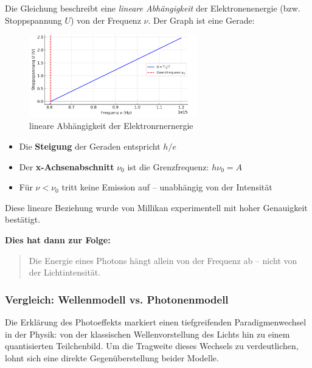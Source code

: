 Die Gleichung beschreibt eine \textit{lineare Abhängigkeit} der Elektronenenergie (bzw. Stoppspannung \( U \)) von der Frequenz \( \nu \). Der Graph ist eine Gerade:
\begin{figure}[H]
	\includegraphics[width=0.65\textwidth]{bilder/photoeffekt.png}
	\caption{lineare Abhängigkeit der Elektronrnernergie}
\end{figure}

\begin{itemize}
	\item Die \textbf{Steigung} der Geraden entspricht \( h/e \)
	\item Der \textbf{x-Achsenabschnitt} \( \nu_0 \) ist die Grenzfrequenz: \( h \nu_0 = A \)
	\item Für \( \nu < \nu_0 \) tritt keine Emission auf – unabhängig von der Intensität
\end{itemize}

Diese lineare Beziehung wurde von Millikan experimentell mit hoher Genauigkeit bestätigt.

\textbf{Dies hat dann zur Folge:}

\begin{quote}
	Die Energie eines Photons hängt allein von der Frequenz ab – nicht von der Lichtintensität.
\end{quote}
\subsubsection{ Vergleich: Wellenmodell vs. Photonenmodell}

Die Erklärung des Photoeffekts markiert einen tiefgreifenden Paradigmenwechsel in der Physik: von der klassischen Wellenvorstellung des Lichts hin zu einem quantisierten Teilchenbild. Um die Tragweite dieses Wechsels zu verdeutlichen, lohnt sich eine direkte Gegenüberstellung beider Modelle.

